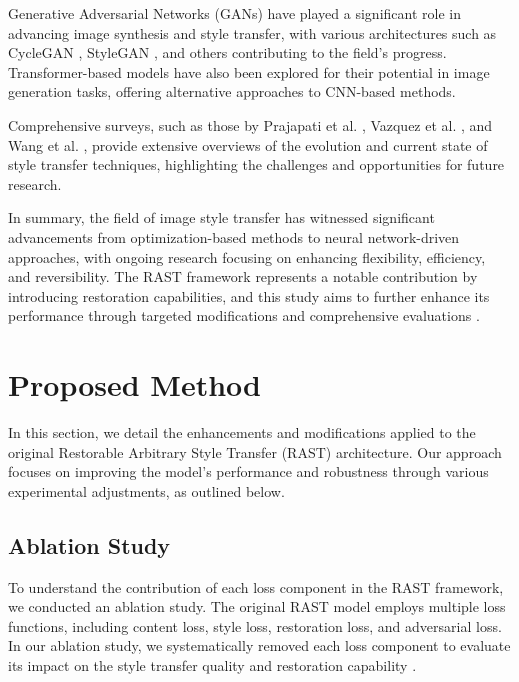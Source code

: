 \documentclass{article}
\begin{document}
Generative Adversarial Networks (GANs) \cite{Goodfellow2014} have played a significant role in advancing image synthesis and style transfer, with various architectures such as CycleGAN \cite{CycleGAN2017}, StyleGAN \cite{StyleGAN2019}, and others contributing to the field's progress. Transformer-based models \cite{Dosovitskiy2020} have also been explored for their potential in image generation tasks, offering alternative approaches to CNN-based methods.

Comprehensive surveys, such as those by Prajapati et al. \cite{Prajapati2020}, Vazquez et al. \cite{Vazquez2018}, and Wang et al. \cite{Wang2020}, provide extensive overviews of the evolution and current state of style transfer techniques, highlighting the challenges and opportunities for future research.

In summary, the field of image style transfer has witnessed significant advancements from optimization-based methods to neural network-driven approaches, with ongoing research focusing on enhancing flexibility, efficiency, and reversibility. The RAST framework represents a notable contribution by introducing restoration capabilities, and this study aims to further enhance its performance through targeted modifications and comprehensive evaluations \cite{Ma2023RAST, Johnson2016, Gatys2016, Huang2017, Li2017, CycleGAN2017, Liu2020, SomeOtherPaper, Li2018, Zhang2018LPIPS, Wang2019, Prajapati2020, Vazquez2018, Wang2020}.

\section{Proposed Method}
\label{sec:proposed_method}

In this section, we detail the enhancements and modifications applied to the original Restorable Arbitrary Style Transfer (RAST) architecture. Our approach focuses on improving the model's performance and robustness through various experimental adjustments, as outlined below.

\subsection{Ablation Study}
To understand the contribution of each loss component in the RAST framework, we conducted an ablation study. The original RAST model employs multiple loss functions, including content loss, style loss, restoration loss, and adversarial loss. In our ablation study, we systematically removed each loss component to evaluate its impact on the style transfer quality and restoration capability \cite{Liu2019, He2016}.
\end{document}
